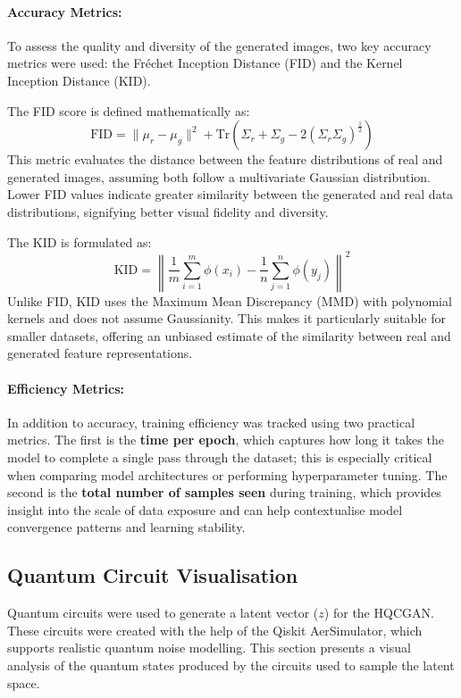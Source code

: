 \documentclass[conference]{IEEEtran}
\begin{document}
\paragraph{Accuracy Metrics:}
To assess the quality and diversity of the generated images, two key accuracy metrics were used: the Fréchet Inception Distance (FID) and the Kernel Inception Distance (KID).

The FID score is defined mathematically as:
\begin{equation}
\text{FID} = \lVert \mu_r - \mu_g \rVert^2 + \text{Tr} \left( \Sigma_r + \Sigma_g - 2 (\Sigma_r \Sigma_g)^{\frac{1}{2}} \right)
\end{equation}
This metric evaluates the distance between the feature distributions of real and generated images, assuming both follow a multivariate Gaussian distribution. Lower FID values indicate greater similarity between the generated and real data distributions, signifying better visual fidelity and diversity.

The KID is formulated as:
\begin{equation}
\text{KID} = \left\lVert \frac{1}{m} \sum_{i=1}^{m} \phi(x_i) - \frac{1}{n} \sum_{j=1}^{n} \phi(y_j) \right\rVert^2
\end{equation}
Unlike FID, KID uses the Maximum Mean Discrepancy (MMD) with polynomial kernels and does not assume Gaussianity. This makes it particularly suitable for smaller datasets, offering an unbiased estimate of the similarity between real and generated feature representations.

\paragraph{Efficiency Metrics:}
In addition to accuracy, training efficiency was tracked using two practical metrics. The first is the \textbf{time per epoch}, which captures how long it takes the model to complete a single pass through the dataset; this is especially critical when comparing model architectures or performing hyperparameter tuning. The second is the \textbf{total number of samples seen} during training, which provides insight into the scale of data exposure and can help contextualise model convergence patterns and learning stability.

\subsection{Quantum Circuit Visualisation}
Quantum circuits were used to generate a latent vector ($z$) for the HQCGAN. These circuits were created with the help of the Qiskit AerSimulator, which supports realistic quantum noise modelling. This section presents a visual analysis of the quantum states produced by the circuits used to sample the latent space.
\end{document}
